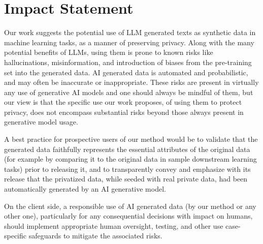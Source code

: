 \newpage
\section{Impact Statement}
Our work suggests the potential use of LLM generated texts as synthetic data in machine learning tasks, as a manner of preserving privacy. Along with the many potential benefits of LLMs, using them is prone to known risks like hallucinations, misinformation, and introduction of biases from the pre-training set into the generated data. 
AI generated data is automated and probabilistic, and may often be inaccurate or inappropriate. 
These risks are present in virtually any use of generative AI models and one should always be mindful of them, but our view is that the specific use our work proposes, of using them to protect privacy, does not encompass substantial risks beyond those always present in generative model usage. 

A best practice for prospective users of our method would be to validate that the generated data faithfully represents the essential attributes of the original data (for example by comparing it to the original data in sample downstream learning tasks) prior to releasing it, and to transparently convey and emphasize with its release that the privatized data, while seeded with real private data, had been automatically generated by an AI generative model.

On the client side, a responsible use of AI generated data (by our method or any other one), particularly for any consequential decisions with impact on humans, should implement appropriate human oversight, testing, and other use case-specific safeguards to mitigate the associated risks.